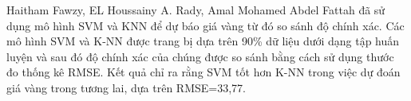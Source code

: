 Haitham Fawzy, EL Houssainy A. Rady, Amal Mohamed Abdel Fattah\cite{article} đã sử dụng mô hình SVM và KNN để dự báo giá vàng từ đó so sánh độ chính xác. Các mô hình SVM và K-NN được trang bị dựa trên 90\% dữ liệu dưới dạng tập huấn luyện và sau đó độ chính xác của chúng được so sánh bằng cách sử dụng thước đo thống kê RMSE. Kết quả chỉ ra rằng SVM tốt hơn K-NN trong việc dự đoán giá vàng trong tương lai, dựa trên RMSE=33,77.